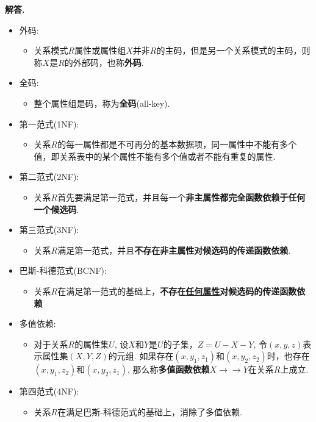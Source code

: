 \documentclass[12pt, oneside]{ctexart}
\numberwithin{figure}{section}
\numberwithin{table}{section}
\def\red{\color{red}}
\newenvironment{solution}{\par\noindent\textbf{解答. }}{\par}
\begin{document}
\begin{solution}
\begin{itemize}
\begin{itemize}
            \end{itemize}
        \item 外码: 
            \begin{itemize}
                \item 关系模式$R$属性或属性组$X$并非$R$的主码，但是另一个关系模式的主码，则称$X$是$R$的外部码，也称\textbf{\red 外码}.
            \end{itemize}
        \item 全码: 
            \begin{itemize}
                \item 整个属性组是码，称为\textbf{\red 全码}(all-key).
            \end{itemize}
        \item 第一范式(1NF): 
            \begin{itemize}
                \item 关系$R$的每一属性都是不可再分的基本数据项，同一属性中不能有多个值，即关系表中的某个属性不能有多个值或者不能有重复的属性.
            \end{itemize}
        \item 第二范式(2NF): 
            \begin{itemize}
                \item 关系$R$首先要满足第一范式，并且每一个\textbf{\red 非主属性都完全函数依赖于任何一个候选码}.
            \end{itemize}
        \item 第三范式(3NF): 
            \begin{itemize}
                \item 关系$R$满足第一范式，并且\textbf{\red 不存在非主属性对候选码的传递函数依赖}.
            \end{itemize}
        \item 巴斯-科德范式(BCNF): 
            \begin{itemize}
                \item 关系$R$在满足第一范式的基础上，\textbf{\red 不存在\uline{任何属性}对候选码的传递函数依赖}
            \end{itemize}
        \item 多值依赖:
            \begin{itemize}
                \item 对于关系$R$的属性集$U$, 设$X$和$Y$是$U$的子集，$Z = U - X - Y$, 令$(x, y, z)$表示属性集$(X, Y, Z)$的元组. 如果存在$(x, y_1, z_1)$和$(x, y_2, z_2)$时，也存在$(x, y_1, z_2)$和$(x, y_2, z_1)$, 那么称\textbf{\red 多值函数依赖}$X \rightarrow\rightarrow Y$在关系$R$上成立.
            \end{itemize}
        \item 第四范式(4NF): 
            \begin{itemize}
                \item 关系$R$在满足巴斯-科德范式的基础上，消除了多值依赖.
            \end{itemize} 
    \end{itemize}
\end{solution}
\end{document}
